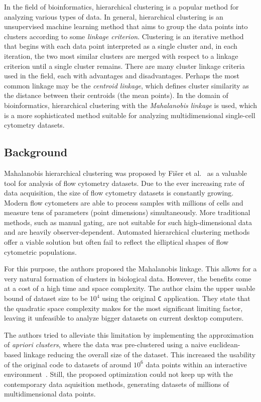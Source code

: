 In the field of bioinformatics, hierarchical clustering is a popular method for analyzing various types of data. 
In general, hierarchical clustering is an unsupervised machine learning method that aims to group the data points into clusters according to some \emph{linkage criterion}.
Clustering is an iterative method that begins with each data point interpreted as a single cluster and, in each iteration, the two most similar clusters are merged with respect to a linkage criterion until a single cluster remains.
There are many cluster linkage criteria used in the field, each with advantages and disadvantages. 
Perhaps the most common linkage may be the \emph{centroid linkage}, which defines cluster similarity as the distance between their centroids (the mean points). In the domain of bioinformatics, hierarchical clustering with the \emph{Mahalanobis linkage} is used, which is a more sophisticated method suitable for analyzing multidimensional single-cell cytometry datasets.

\subsection{Background}

Mahalanobis hierarchical clustering was proposed by Fišer et al.~\cite{fivser2012detection} as a valuable tool for analysis of flow cytometry datasets. Due to the ever increasing rate of data acquisition, the size of flow cytometry datasets is constantly growing. Modern flow cytometers are able to process samples with millions of cells and measure tens of parameters (point dimensions) simultaneously. More traditional methods, such as manual gating, are not suitable for such high-dimensional data and are heavily observer-dependent. Automated hierarchical clustering methods offer a viable solution but often fail to reflect the elliptical shapes of flow cytometric populations. 

For this purpose, the authors proposed the Mahalanobis linkage. This allows for a very natural formation of clusters in biological data. However, the benefits come at a cost of a high time and space complexity. The author claim the upper usable bound of dataset size to be $10^4$ using the original \texttt{C} application. They state that the quadratic space complexity makes for the most significant limiting factor, leaving it unfeasible to analyze bigger datasets on current desktop computers.

The authors tried to alleviate this limitation by implementing the approximation of \emph{apriori clusters}, where the data was pre-clustered using a naive euclidean-based linkage reducing the overall size of the dataset. This increased the usability of the original code to datasets of around $10^6$ data points within an interactive environment~\cite{kratochvil2020shinysom}. Still, the proposed optimization could not keep up with the contemporary data aquisition methods, generating datasets of millions of multidimensional data points.

